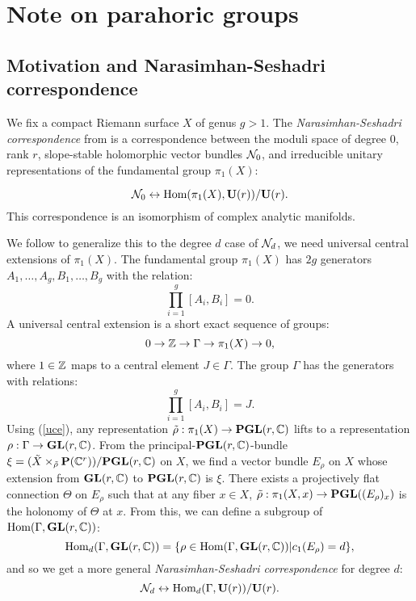 \section{Note on parahoric groups}
\subsection{Motivation and Narasimhan-Seshadri correspondence}
We fix a compact Riemann surface $X$ of genus $g>1$.
The \textit{Narasimhan-Seshadri correspondence} from \cite{ns} is a correspondence between the moduli space of degree $0$, rank $r$, slope-stable holomorphic vector bundles $\mathcal{N}_0$, and irreducible unitary representations of the fundamental group $\pi_1(X)$:

\begin{equation}
    \mathcal{N}_0\leftrightarrow\text{Hom}(\pi_1(X),\mathbf{U}(r))/\mathbf{U}(r).
\end{equation}
This correspondence is an isomorphism of complex analytic manifolds.

We follow \cite[Appendix, Section 4]{dacm} to generalize this to the degree $d$ case of $\mathcal{N}_d$, we need universal central extensions of $\pi_1(X)$. The fundamental group $\pi_1(X)$ has $2g$ generators $A_1,\ldots,A_g,B_1,\ldots,B_g$ with the relation:
\begin{equation}
    \prod_{i=1}^g[A_i,B_i]=0.
\end{equation}
A universal central extension is a short exact sequence of groups:
\begin{equation}\label{uce}
    0\rightarrow\mathbb{Z}\rightarrow\Gamma\rightarrow\pi_1(X)\rightarrow0,
\end{equation}
where $1\in\mathbb{Z}$ maps to a central element $J\in\Gamma$. The group $\Gamma$ has the generators with relations:
\begin{equation}
    \prod_{i=1}^g[A_i,B_i]=J.
\end{equation}
\sloppy
Using (\ref{uce}), any representation $\tilde{\rho}:\pi_1(X)\rightarrow\mathbf{PGL}(r,\mathbb{C})$ lifts to a representation $\rho:\Gamma\rightarrow\mathbf{GL}(r,\mathbb{C})$. From the principal-$\mathbf{PGL}(r,\mathbb{C})$-bundle $\xi=(\tilde{X}\times_{\tilde{\rho}}\mathbf{P}(\mathbb{C}^r))/\mathbf{PGL}(r,\mathbb{C})$ on $X$, we find a vector bundle $E_\rho$ on $X$ whose extension from $\mathbf{GL}(r,\mathbb{C})$ to $\mathbf{PGL}(r,\mathbb{C})$ is $\xi$. There exists a projectively flat connection $\Theta$ on $E_\rho$ such that at any fiber $x\in X$, $\tilde{\rho}:\pi_1(X,x)\rightarrow\mathbf{PGL}((E_\rho)_x)$ is the holonomy of $\Theta$ at $x$.
From this, we can define a subgroup of $\text{Hom}(\Gamma,\mathbf{GL}(r,\mathbb{C}))$:
\begin{equation}
    \text{Hom}_d(\Gamma,\mathbf{GL}(r,\mathbb{C}))=\{\rho\in\text{Hom}(\Gamma,\mathbf{GL}(r,\mathbb{C}))|c_1(E_\rho)=d\},
\end{equation}
and so we get a more general \textit{Narasimhan-Seshadri correspondence} for degree $d$:
\begin{equation}
    \mathcal{N}_d\leftrightarrow\text{Hom}_d(\Gamma,\mathbf{U}(r))/\mathbf{U}(r).
\end{equation}

